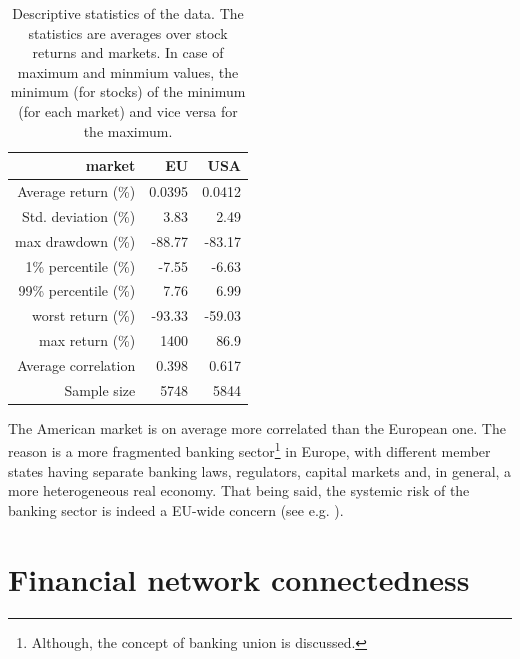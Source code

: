 \documentclass[12pt]{article}
\begin{document}
\begin{table}[h]
	\centering
	\begin{tabular}{r|r|r}
		market & EU & USA \\ 
		\hline \hline
		Average return (\%)& 0.0395 & 0.0412 \\ 
		Std. deviation (\%)& 3.83 & 2.49 \\ 
		max drawdown (\%)& -88.77 & -83.17 \\
		1\% percentile (\%)& -7.55 & -6.63 \\ 
		99\% percentile (\%)& 7.76 & 6.99 \\ 
		worst return (\%)& -93.33 & -59.03 \\ 
		max return (\%)& 1400 &   86.9 \\ 
		Average correlation & 0.398 & 0.617 \\
		Sample size & 5748 & 5844 \\ 
	\end{tabular}
	\caption{Descriptive statistics of the data. The statistics are averages over stock returns and markets. In case of maximum and minmium values, the minimum (for stocks) of the minimum (for each market) and vice versa for the maximum.}
	\label{table:descriptive}
\end{table}

The American market is on average more correlated than the European one. The reason is a more fragmented banking sector\footnote{Although, the concept of banking union is discussed.} in Europe, with different member states having separate banking laws, regulators, capital markets and, in general, a more heterogeneous real economy. That being said, the systemic risk of the banking sector is indeed a EU-wide concern (see e.g. \cite{song21}). 

\section{Financial network connectedness}\label{section:fin_network}
\end{document}
